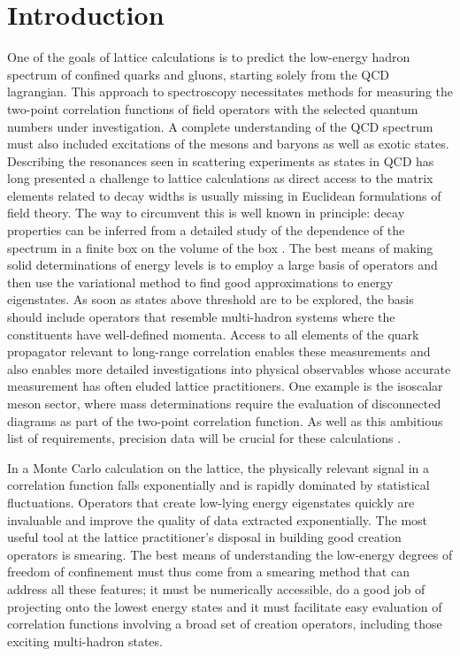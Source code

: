 \section{Introduction}

One of the goals of lattice calculations is to predict the low-energy hadron
spectrum of confined quarks and gluons, starting solely from the QCD
lagrangian. This approach to spectroscopy necessitates methods for measuring the
two-point correlation functions of field operators with the selected quantum
numbers under investigation. A complete understanding of the QCD spectrum
must also included excitations of the mesons and baryons as well as exotic
states.
Describing the resonances seen in scattering experiments
as states in QCD has long presented a challenge to lattice calculations as
direct access to the matrix elements related to decay widths is usually
missing in Euclidean formulations of field theory. The way to circumvent this
is well known in principle: decay properties can be inferred from a detailed
study of the dependence of the spectrum in a finite box on the volume
of the box \cite{DeWitt:1956be,Luscher:1991cf}.
The best means of making solid determinations of energy levels is to employ a
large basis of operators and then use the variational method to find good
approximations to energy eigenstates. As soon as states above threshold are to
be explored, the basis should include operators that resemble multi-hadron
systems where the constituents have well-defined momenta.
Access to all elements of the quark propagator \cite{Foley:2005ac} relevant
to long-range correlation enables these measurements and
also enables more detailed investigations into physical observables
whose accurate measurement has often eluded lattice practitioners. One example
is the isoscalar meson sector, where mass determinations require the
evaluation of disconnected diagrams as part of the two-point correlation
function.  As well as
this ambitious list of requirements, precision data
will be crucial for these calculations \cite{Morningstar:2008mc}.

In a Monte Carlo calculation on the lattice, the physically relevant signal in
a correlation function falls exponentially and is rapidly dominated by
statistical fluctuations. Operators that create low-lying energy eigenstates
quickly are invaluable and improve the quality of data extracted
exponentially. The most useful tool at the lattice practitioner's disposal in
building good creation operators is smearing. The best means of
understanding the low-energy degrees of freedom of confinement must thus come
from a smearing method that can address all these features; it must be
numerically accessible, do a good job of projecting onto the lowest energy
states and it must facilitate easy evaluation of correlation functions
involving a broad set of creation operators, including those exciting
multi-hadron states.

